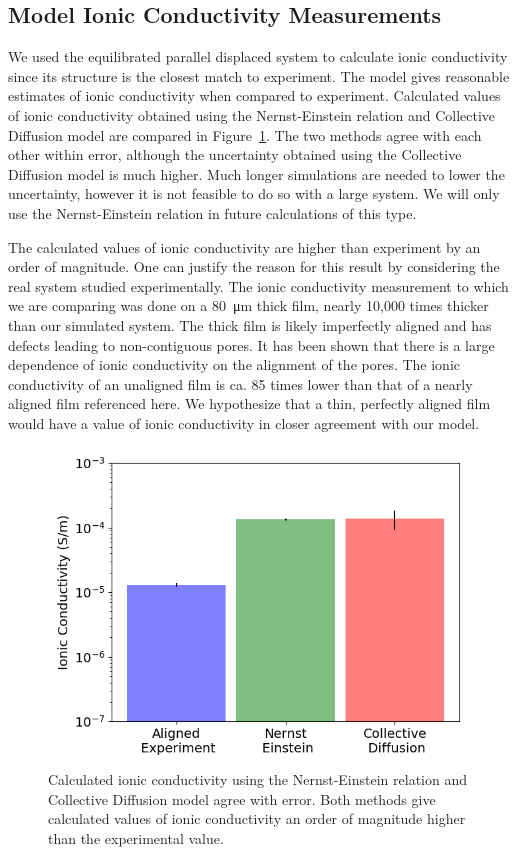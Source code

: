 \documentclass{article}
\begin{document}
  \subsection{Model Ionic Conductivity Measurements}

  We used the equilibrated parallel displaced system to calculate ionic
  conductivity since its structure is the closest match to experiment. The model
  gives reasonable estimates of ionic conductivity when compared to experiment.
  Calculated values of ionic conductivity obtained using the Nernst-Einstein
  relation and Collective Diffusion model are compared in
  Figure~\ref{fig:conductivity}. The two methods agree with each other within
  error, although the uncertainty obtained using the Collective Diffusion model
  is much higher. Much longer simulations are needed to lower the uncertainty,
  however it is not feasible to do so with a large system. We will only use the
  Nernst-Einstein relation in future calculations of this type. 

  The calculated values of ionic conductivity are higher than experiment by an
  order of magnitude. One can justify the reason for this result by considering
  the real system studied experimentally. The ionic conductivity measurement to
  which we are comparing was done on a \SI{80}{\micro\metre} thick film, nearly
  10,000 times thicker than our simulated system. The thick film is likely
  imperfectly aligned and has defects leading to non-contiguous pores. It has
  been shown that there is a large dependence of ionic conductivity on the
  alignment of the pores. The ionic conductivity of an unaligned film is ca. 85
  times lower than that of a nearly aligned film referenced here. We hypothesize
  that a thin, perfectly aligned film would have a value of ionic conductivity in
  closer agreement with our model.
 
  \begin{figure}
        \centering
        \includegraphics[width=0.5\linewidth]{IC_offset.png}
        \caption{Calculated ionic conductivity using the Nernst-Einstein relation
        and Collective Diffusion model agree with error. Both methods give calculated
        values of ionic conductivity an order of magnitude higher than the experimental
        value.}
        \label{fig:conductivity}
  \end{figure}
\end{document}
